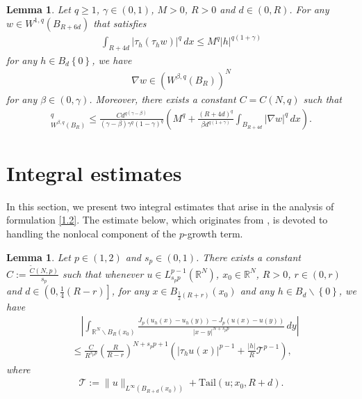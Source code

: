 \documentclass[reqno,10pt]{amsart}
\numberwithin{equation}{section}
\newtheorem{lemma}[theorem]{Lemma}
\begin{document}
\begin{lemma}
	\label{lem21}
	Let $q\ge1$, $\gamma\in(0, 1)$, $M>0$, $R>0$ and $d\in(0,R)$.  For any $w\in W^{1,q}(B_{R+6d})$ that satisfies
	\begin{align*}
		\int_{R+4d}|\tau_h(\tau_hw)|^q\,dx\le M^q|h|^{q(1+\gamma)}
	\end{align*}
	for any $h\in B_d\left\lbrace 0\right\rbrace $, we have
	\begin{align*}
		\nabla w\in \left( W^{\beta,q}(B_R)\right)^N 
	\end{align*}
	for any $\beta\in(0, \gamma)$. Moreover, there exists a constant $C=C(N, q)$ such that
	\begin{align*}
		[\nabla w]^q_{W^{\beta,q}(B_R)}\le \frac{Cd^{q(\gamma-\beta)}}{(\gamma-\beta)\gamma^q(1-\gamma)^q}\left(M^q+\frac{(R+4d)^q}{\beta d^{q(1+\gamma)}}\int_{B_{R+4d}}|\nabla w|^q\,dx\right). 
	\end{align*}
\end{lemma}

\section{Integral estimates}
\label{sec3}
In this section, we present two integral estimates that arise in the analysis of formulation \eqref{1.2}.
The estimate below, which originates from \cite[Lemma 3.2]{BDL2401}, is devoted to handling the nonlocal component of the $p$-growth term.

\begin{lemma}
	\label{lem8}
	Let $p\in(1, 2)$ and $s_p\in(0, 1)$. There exists a constant $C:=\frac{\tilde{C}(N,p)}{s_p}$ such that whenever $u\in L^{p-1}_{s_pp}(\mathbb{R}^N)$, $x_0\in\mathbb{R}^N$, $R>0$, $r\in(0,r)$ and $d\in \left( 0,\frac{1}{4}(R-r)\right] $, for any $x\in B_{\frac{1}{2}(R+r)}(x_0)$ and any $h\in B_d\backslash \left\lbrace 0\right\rbrace $, we have
	\begin{align*}
		&\quad\left| \int_{\mathbb{R}^N\backslash B_R(x_0)}\frac{J_p\left( u_h(x)-u_h(y)\right)-J_p\left( u(x)-u(y)\right) }{|x-y|^{N+s_pp}}\,dy\right|\\
		&\le \frac{C}{R^{s_pp}}\left( \frac{R}{R-r}\right)^{N+s_pp+1}\left( |\tau_hu(x)|^{p-1}+\frac{|h|}{R}\mathcal{T}^{p-1}\right),
	\end{align*}
	where
	\begin{align*}
		\mathcal{T}:=\|u\|_{L^\infty(B_{R+d}(x_0))}+\mathrm{Tail}(u;x_0,R+d).
	\end{align*}
\end{lemma}
\end{document}
